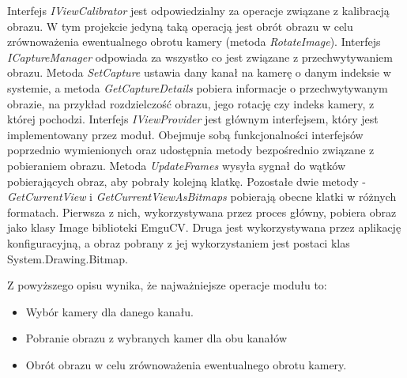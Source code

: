 \documentclass[a4paper,11pt,twoside]{report}
\theoremstyle{definition}
\begin{document}
Interfejs \textit{IViewCalibrator} jest odpowiedzialny za operacje związane z kalibracją obrazu. W tym projekcie jedyną taką operacją jest obrót obrazu w celu zrównoważenia ewentualnego obrotu kamery (metoda \textit{RotateImage}).
Interfejs \textit{ICaptureManager} odpowiada za wszystko co jest związane z przechwytywaniem obrazu. Metoda \textit{SetCapture} ustawia dany kanał na kamerę o danym indeksie w systemie, a metoda \textit{GetCaptureDetails} pobiera informacje o przechwytywanym obrazie, na przykład rozdzielczość obrazu, jego rotację czy indeks kamery, z której pochodzi.
Interfejs \textit{IViewProvider} jest głównym interfejsem, który jest implementowany przez moduł. Obejmuje sobą funkcjonalności interfejsów poprzednio wymienionych oraz udostępnia metody bezpośrednio związane z pobieraniem obrazu. Metoda \textit{UpdateFrames} wysyła sygnał do wątków pobierających obraz, aby pobrały kolejną klatkę. Pozostałe dwie metody - \textit{GetCurrentView} i \textit{GetCurrentViewAsBitmaps} pobierają obecne klatki w różnych formatach. Pierwsza z nich, wykorzystywana przez proces główny, pobiera obraz jako klasy Image biblioteki EmguCV. Druga jest wykorzystywana przez aplikację konfiguracyjną, a obraz pobrany z jej wykorzystaniem jest postaci klas System.Drawing.Bitmap.

Z powyższego opisu wynika, że najważniejsze operacje modułu to:
\begin{itemize}
\item Wybór kamery dla danego kanału.
\item Pobranie obrazu z wybranych kamer dla obu kanałów
\item Obrót obrazu w celu zrównoważenia ewentualnego obrotu kamery.
\end{itemize}
\end{document}
